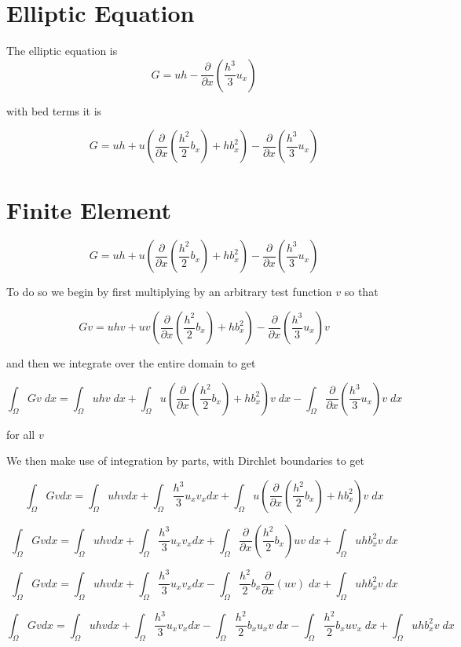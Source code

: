 \documentclass[12pt]{article}
\begin{document}
\section{Elliptic Equation}
The elliptic equation is
\[G = uh - \frac{\partial}{\partial x}\left(\frac{h^3}{3}u_x\right)\]

with bed terms it is

\[G = uh + u\left(\frac{\partial}{\partial x}\left( \frac{h^2}{2}b_x\right) + h b_x^2\right) - \frac{\partial}{\partial x}\left(\frac{h^3}{3}u_x\right)\]


\section{Finite Element}


\[G = uh + u\left(\frac{\partial}{\partial x}\left( \frac{h^2}{2}b_x\right) + h b_x^2\right) - \frac{\partial}{\partial x}\left(\frac{h^3}{3}u_x\right)\]

To do so we begin by first multiplying by an arbitrary test function $v$ so that


\[Gv = uhv + uv\left(\frac{\partial}{\partial x}\left( \frac{h^2}{2}b_x\right) + h b_x^2\right) - \frac{\partial}{\partial x}\left(\frac{h^3}{3}u_x\right)v\]

and then we integrate over the entire domain to get 

\[\int_\Omega Gv \; dx = \int_\Omega uhv \; dx + \int_\Omega u\left(\frac{\partial}{\partial x}\left( \frac{h^2}{2}b_x\right) + h b_x^2\right)v \; dx - \int_\Omega \frac{\partial}{\partial x}\left(\frac{h^3}{3}u_x\right)v \; dx\]

for all $v$

We then make use of integration by parts, with Dirchlet boundaries to get

\[\int_\Omega Gv dx = \int_\Omega uhv dx + \int_\Omega\frac{h^3}{3}u_{x}v_xdx + \int_\Omega u\left(\frac{\partial}{\partial x}\left( \frac{h^2}{2}b_x\right) + h b_x^2\right)v \; dx\]

\[\int_\Omega Gv dx = \int_\Omega uhv dx + \int_\Omega\frac{h^3}{3}u_{x}v_xdx + \int_\Omega \frac{\partial}{\partial x}\left( \frac{h^2}{2}b_x\right) uv \; dx + \int_\Omega u h b_x^2 v \; dx\]

\[\int_\Omega Gv dx = \int_\Omega uhv dx + \int_\Omega\frac{h^3}{3}u_{x}v_xdx - \int_\Omega  \frac{h^2}{2}b_x \frac{\partial}{\partial x}\left(uv\right)  \; dx + \int_\Omega u h b_x^2 v \; dx\]

\[\int_\Omega Gv dx = \int_\Omega uhv dx + \int_\Omega\frac{h^3}{3}u_{x}v_xdx - \int_\Omega  \frac{h^2}{2}b_x u_x v \; dx - \int_\Omega  \frac{h^2}{2}b_x u v_x \; dx + \int_\Omega u h b_x^2 v \; dx\]
\end{document}
